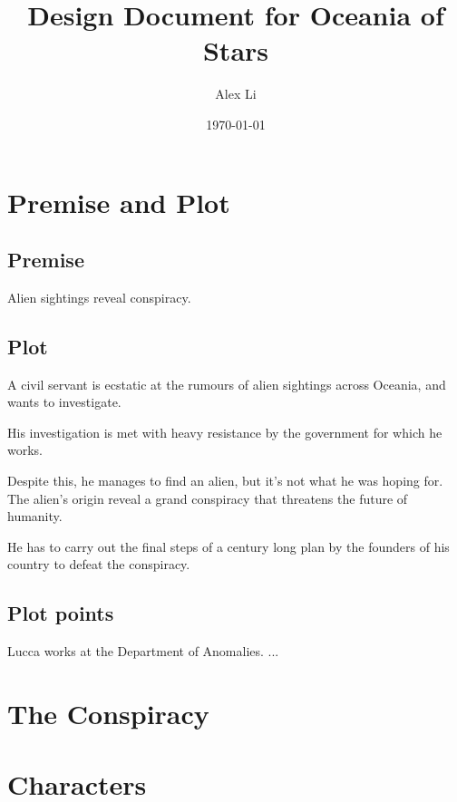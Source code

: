 \documentclass[11pt]{article}
\begin{document}
\begin{titlepage}
\title{Design Document for Oceania of Stars}
\author{Alex Li}
\date{\today} %
\maketitle
\thispagestyle{empty} %
\end{titlepage}


\tableofcontents
\newpage %



\section{Premise and Plot}
	\subsection{Premise}
	Alien sightings reveal conspiracy.
	\subsection{Plot}
	A civil servant is ecstatic at the rumours of alien sightings across Oceania, and wants to investigate.
	
	His investigation is met with heavy resistance by the government for which he works.
	
	Despite this, he manages to find an alien, but it's not what he was hoping for. The alien's origin reveal a grand conspiracy that threatens the future of humanity.
	
	He has to carry out the final steps of a century long plan by the founders of his country to defeat the conspiracy. 
	\subsection{Plot points}
	Lucca works at the Department of Anomalies. 
	...
\newpage
\section{The Conspiracy}
	
	
\newpage
\section{Characters}
\end{document}

